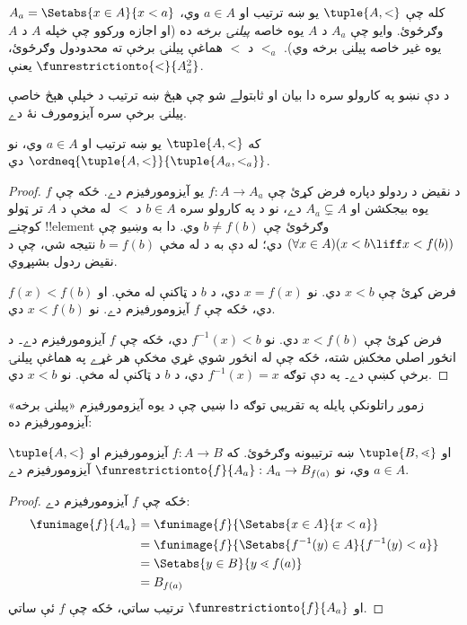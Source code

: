 \documentclass[../../../include/open-logic-section]{subfiles}
\begin{document}
\begin{defn}
کله چې $\tuple{A, <}$ يو ښه ترتيب او $a \in A$ وي،
$A_a = \Setabs{x \in A}{x < a}$ وګرځوئ. وايو چې $A_a$ د $A$
يوه خاصه \emph{پيلنۍ برخه} ده (او اجازه ورکوو چې خپله $A$ د
$A$ يوه غير خاصه پيلنۍ برخه وي). $<_a$ د $<$ هماغې پيلنۍ
برخې ته محدودول وګرځوئ، يعنې
$\funrestrictionto{\mathord{<}}{A_a^2}$.
\end{defn}
\noindent
د دې نښو په کارولو سره دا بيان او ثابتولے شو چې هېڅ ښه ترتيب
د خپلې هېڅ خاصې پيلنۍ برخې سره آيزومورف نۀ دے.

\begin{lem}
که $\tuple{A, <}$ يو ښه ترتيب او $a \in A$ وي، نو
$\ordneq{\tuple{A, <}}{\tuple{A_a, <_a}}$ دي.
\end{lem}

\begin{proof}
د نقيض د ردولو دپاره فرض کړئ چې $f \colon A \to A_a$ يو
آيزومورفيزم دے. ځکه چې $f$ يوه بيجکشن او $A_a \subsetneq A$
دے، نو د  په کارولو سره $b \in A$
د $<$ له مخې د $A$ تر ټولو کوچنے !!{element} وګرځوئ چې
$b \neq f(b)$ وي. دا به وښيو چې
$(\forall x \in A)(x<b \liff x < f(b))$ دي؛ له دې به د
له مخې $b = f(b)$ نتيجه شي، چې د نقيض ردول بشپړوي.

فرض کړئ چې $x < b$ دي. نو $x = f(x)$ دي، د $b$ د ټاکنې له مخې.
او $f(x) < f(b)$ دي، ځکه چې $f$ آيزومورفيزم دے.
نو $x < f(b)$ دي.

فرض کړئ چې $x < f(b)$ دي. نو $f^{-1}(x) < b$ دي، ځکه چې
$f$ آيزومورفيزم دے۔ د انځور اصلي مخکښ شته، ځکه چې له
انځور شوي غړي مخکې هر غړے په هماغې پيلنۍ برخې کښې دے۔
په دې توګه $f^{-1}(x) = x$ دي، د $b$ د ټاکنې له مخې. نو $x < b$ دي.
\end{proof}

زموږ راتلونکې پايله په تقريبي توګه دا ښيي چې د يوه آيزومورفيزم
«پيلنۍ برخه» آيزومورفيزم ده:

\begin{lem}
$\tuple{A, <}$ او $\tuple{B, \lessdot}$ ښه ترتيبونه وګرځوئ.
که $f\colon A \to B$ آيزومورفيزم او $a \in A$ وي، نو
$\funrestrictionto{f}{A_{a}} : A_a \to B_{f(a)}$ آيزومورفيزم دے.
\end{lem}

\begin{proof}
ځکه چې $f$ آيزومورفيزم دے:
\begin{align*}
	\funimage{f}{A_a} &= \funimage{f}{\Setabs{x \in A}{x < a}}\\
	&= \funimage{f}{\Setabs{f^{-1}(y) \in A}{f^{-1}(y) < a}} \\
	&= \Setabs{y \in B}{y \lessdot f(a)} \\
	&=B_{f(a)}
\end{align*}
او $\funrestrictionto{f}{A_a}$ ترتيب ساتي، ځکه چې $f$ ئې ساتي.
\end{proof}
\end{document}
